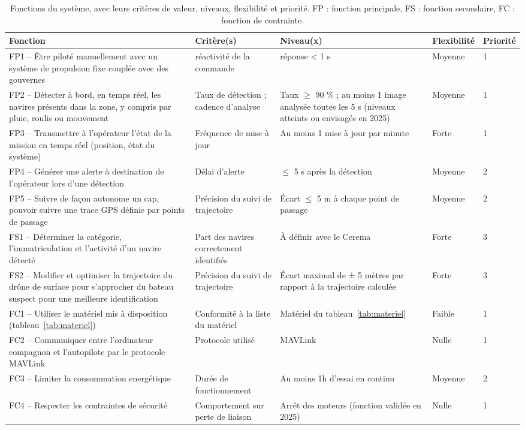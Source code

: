 \begin{table}[H]
\centering
\small
\caption{Fonctions du système, avec leurs critères de valeur, niveaux, flexibilité et priorité. FP : fonction principale, FS : fonction secondaire, FC : fonction de contrainte.}
\label{tab:fonctions}
\begin{tabularx}{\textwidth}{@{}Lp{3cm}p{2.4cm}p{1.8cm}p{1.3cm}@{}}
\toprule
\textbf{Fonction} & \textbf{Critère(s)} & \textbf{Niveau(x)} & \textbf{Flexibilité} & \textbf{Priorité} \\
\midrule
FP1 -- Être piloté manuellement avec un système de propulsion fixe couplée avec des gouvernes & réactivité de la commande & réponse < 1 s & Moyenne & 1 \\
\addlinespace
FP2 -- Détecter à bord, en temps réel, les navires présents dans la zone, y compris par pluie, roulis ou mouvement & Taux de détection ; cadence d'analyse & Taux $\geq$ 90 \% ; au moins 1 image analysée toutes les 5 s (niveaux atteints ou envisagés en 2025) & Moyenne & 1 \\
\addlinespace
FP3 -- Transmettre à l'opérateur l'état de la mission en temps réel (position, état du système) & Fréquence de mise à jour & Au moins 1 mise à jour par minute & Forte & 1 \\
\addlinespace
FP4 -- Générer une alerte à destination de l'opérateur lors d'une détection & Délai d'alerte & $\leq$ 5 s après la détection & Moyenne & 2 \\
\addlinespace

FP5 -- Suivre de façon autonome un cap, pouvoir suivre une trace GPS définie par points de passage & Précision du suivi de trajectoire & Écart $\leq$ 5 m à chaque point de passage & Moyenne & 2 \\
\addlinespace

FS1 -- Déterminer la catégorie, l'immatriculation et l'activité d'un navire détecté & Part des navires correctement identifiés & À définir avec le Cerema & Forte & 3 \\
\addlinespace

FS2 -- Modifier et optimiser la trajectoire du drône de surface pour s'approcher du bateau suspect pour une meilleure identification & Précision du suivi de trajectoire & Écart maximal de ± 5 mètres par rapport à la trajectoire calculée & Forte & 3 \\
\addlinespace

FC1 -- Utiliser le matériel mis à disposition (tableau~\ref{tab:materiel}) & Conformité à la liste du matériel & Matériel du tableau~\ref{tab:materiel} & Faible & 1 \\
\addlinespace
FC2 -- Communiquer entre l'ordinateur compagnon et l'autopilote par le protocole MAVLink & Protocole utilisé & MAVLink & Nulle & 1 \\
\addlinespace
FC3 -- Limiter la consommation energétique & Durée de fonctionnement & Au moins 1h d'essai en continu & Moyenne & 2 \\
\addlinespace
FC4 -- Respecter les contraintes de sécurité & Comportement sur perte de liaison & Arrêt des moteurs (fonction validée en 2025) & Nulle & 1 \\
\bottomrule
\end{tabularx}
\end{table}

